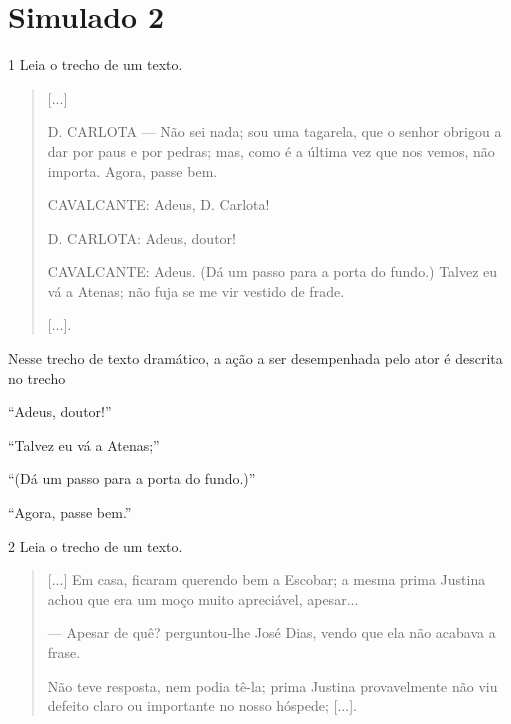 \chapter{Simulado 2}

\num{1} Leia o trecho de um texto.

\begin{quote}
{[}...{]}

D. CARLOTA --- Não sei nada; sou uma tagarela, que o senhor obrigou a
dar por paus e por pedras; mas, como é a última vez que nos vemos, não
importa. Agora, passe bem.

CAVALCANTE: Adeus, D. Carlota!

D. CARLOTA: Adeus, doutor!

CAVALCANTE: Adeus. (Dá um passo para a porta do fundo.) Talvez eu vá a
Atenas; não fuja se me vir vestido de frade.

{[}...{]}.

\end{quote}

Nesse trecho de texto dramático, a ação a ser desempenhada pelo ator é descrita
no trecho

\begin{minipage}{.5\textwidth}
\begin{escolha}
\item “Adeus, doutor!”

\item “Talvez eu vá a Atenas;”

\item “(Dá um passo para a porta do fundo.)”

\item “Agora, passe bem.”
\end{escolha}
\end{minipage}

\num{2} Leia o trecho de um texto.

\begin{quote}
{[}...{]} Em casa, ficaram querendo bem a Escobar; a mesma prima
Justina achou que era um moço muito apreciável, apesar...

--- Apesar de quê? perguntou-lhe José Dias, vendo que ela não acabava a frase.

Não teve resposta, nem podia tê-la; prima Justina provavelmente não viu
defeito claro ou importante no nosso hóspede; {[}...{]}.

\end{quote}

